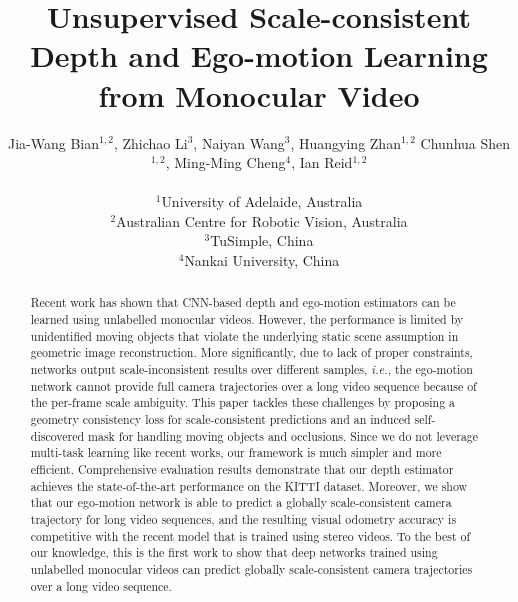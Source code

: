 \documentclass{article}
\title{Unsupervised Scale-consistent Depth and Ego-motion Learning from Monocular Video}
\author{Jia-Wang Bian$^{1,2}$, Zhichao Li$^{3}$, Naiyan Wang$^{3}$,  Huangying Zhan$^{1,2}$
  \And Chunhua Shen$^{1,2}$, Ming-Ming Cheng$^{4}$, Ian Reid$^{1,2}$ \\ \\
  $^{1}$University of Adelaide, Australia \\ 
  $^{2}$Australian Centre for Robotic Vision, Australia \\
  $^{3}$TuSimple, China \\ 
  $^{4}$Nankai University, China
}
\def\ie{\emph{i.e.}}
\begin{document}
\maketitle

\begin{abstract}
Recent work has shown that CNN-based depth and ego-motion estimators can be learned using unlabelled monocular videos.
However, the performance is limited by unidentified moving objects that violate the underlying static scene assumption in geometric image reconstruction.
More significantly, due to lack of proper constraints, networks output scale-inconsistent results over different samples, \ie, the ego-motion network cannot provide full camera trajectories over a long video sequence because of the per-frame scale ambiguity.
This paper tackles these challenges by proposing a geometry consistency loss for scale-consistent predictions and an induced self-discovered mask for handling moving objects and occlusions.
Since we do not leverage multi-task learning like recent works, our framework is much simpler and more efficient.
Comprehensive evaluation results demonstrate that our depth estimator achieves the state-of-the-art performance on the KITTI dataset.
Moreover, we show that our ego-motion network is able to predict a globally scale-consistent camera trajectory for long video sequences,
and the resulting visual odometry accuracy is competitive with the recent model that is trained using stereo videos.
To the best of our knowledge, this is the first work to show that deep networks trained using unlabelled monocular videos can predict globally scale-consistent camera trajectories over a long video sequence.

\end{abstract}
\end{document}
